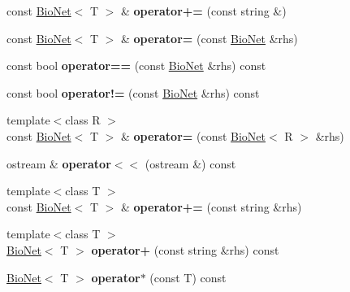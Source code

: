 \begin{DoxyCompactItemize}
\item 
\mbox{\label{class_bio_net_a01a34fc724da95f508b1edb1b010545b}} 
const \hyperlink{class_bio_net}{Bio\+Net}$<$ T $>$ \& {\bfseries operator+=} (const string \&)
\item 
\mbox{\label{class_bio_net_a59581ba7ddaf2b80a6d2478d71c958d5}} 
const \hyperlink{class_bio_net}{Bio\+Net}$<$ T $>$ \& {\bfseries operator=} (const \hyperlink{class_bio_net}{Bio\+Net} \&rhs)
\item 
\mbox{\label{class_bio_net_a689664558c94713b40f78fa67670f355}} 
const bool {\bfseries operator==} (const \hyperlink{class_bio_net}{Bio\+Net} \&rhs) const
\item 
\mbox{\label{class_bio_net_a62efbcf64a6e7cb1070e3fb7aeb1ff83}} 
const bool {\bfseries operator!=} (const \hyperlink{class_bio_net}{Bio\+Net} \&rhs) const
\item 
\mbox{\label{class_bio_net_a4062376b7be85486baaaa110c1912423}} 
{\footnotesize template$<$class R $>$ }\\const \hyperlink{class_bio_net}{Bio\+Net}$<$ T $>$ \& {\bfseries operator=} (const \hyperlink{class_bio_net}{Bio\+Net}$<$ R $>$ \&rhs)
\item 
\mbox{\label{class_bio_net_adfebac99ed2809f3d3cf62a5727f0e9a}} 
ostream \& {\bfseries operator$<$$<$} (ostream \&) const
\item 
\mbox{\label{class_bio_net_ab6d1e15ea52cb798da5d1eefec035e4d}} 
{\footnotesize template$<$class T $>$ }\\const \hyperlink{class_bio_net}{Bio\+Net}$<$ T $>$ \& {\bfseries operator+=} (const string \&rhs)
\item 
\mbox{\label{class_bio_net_af14fa0464ce7943468ff42b48a13807e}} 
{\footnotesize template$<$class T $>$ }\\\hyperlink{class_bio_net}{Bio\+Net}$<$ T $>$ {\bfseries operator+} (const string \&rhs) const
\item 
\mbox{\label{class_bio_net_aa4e9fb16fa8b98eaf2ba5731d4437aa7}} 
\hyperlink{class_bio_net}{Bio\+Net}$<$ T $>$ {\bfseries operator$\ast$} (const T) const

\end{DoxyCompactItemize}
